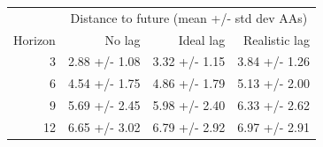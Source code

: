 
\begin{tabular*}{0.7\textwidth}{rrrr}
\toprule
          & \multicolumn{3}{c}{Distance to future (mean +/- std dev AAs)} \\
  Horizon & No lag & Ideal lag & Realistic lag \\
\midrule

3 & 2.88 +/- 1.08 & 3.32 +/- 1.15 & 3.84 +/- 1.26 \\
6 & 4.54 +/- 1.75 & 4.86 +/- 1.79 & 5.13 +/- 2.00 \\
9 & 5.69 +/- 2.45 & 5.98 +/- 2.40 & 6.33 +/- 2.62 \\
12 & 6.65 +/- 3.02 & 6.79 +/- 2.92 & 6.97 +/- 2.91 \\

\bottomrule
\end{tabular*}


